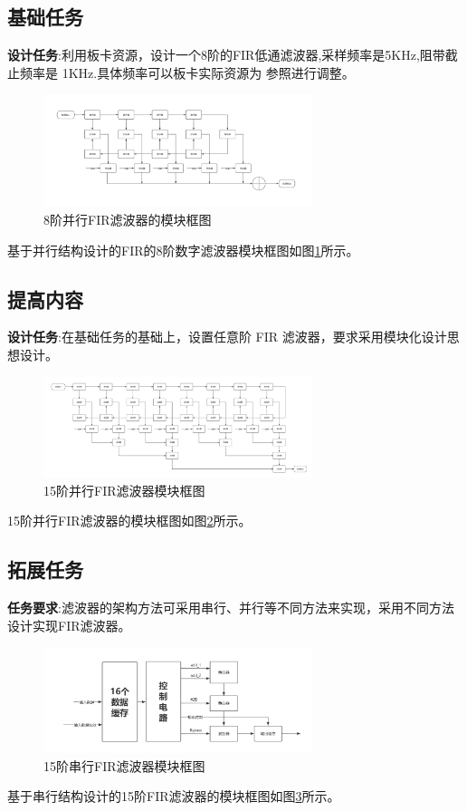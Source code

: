 \documentclass{article}
\begin{document}
\subsection*{基础任务}
\textbf{设计任务}:利用板卡资源，设计一个8阶的FIR低通滤波器,采样频率是5KHz,阻带截止频率是 1KHz.具体频率可以板卡实际资源为
参照进行调整。
\begin{figure}[htbp]
    \centering
    \includegraphics[width=0.7\textwidth]{image/2024-06-28-11-13-34.png}
    \caption{8阶并行FIR滤波器的模块框图}
    \label{image_principle_base_1}
\end{figure}
基于并行结构设计的FIR的8阶数字滤波器模块框图如图\ref{image_principle_base_1}所示。
\subsection*{提高内容}
\textbf{设计任务}:在基础任务的基础上，设置任意阶 FIR 滤波器，要求采用模块化设计思想设计。
\begin{figure}[htbp]
    \centering
    \includegraphics[width=0.7\textwidth]{image/2024-06-28-11-13-08.png}
    \caption{15阶并行FIR滤波器模块框图}
    \label{image_principle_improve_1}
\end{figure}
15阶并行FIR滤波器的模块框图如图\ref{image_principle_improve_1}所示。
\subsection*{拓展任务}
\textbf{任务要求}:滤波器的架构方法可采用串行、并行等不同方法来实现，采用不同方法设计实现FIR滤波器。
\begin{figure}[htbp]
    \centering
    \includegraphics[width=0.7\textwidth]{image/2024-06-28-11-11-33.png}
    \caption{15阶串行FIR滤波器模块框图}
    \label{image_principle_extend_1}
\end{figure}
基于串行结构设计的15阶FIR滤波器的模块框图如图\ref{image_principle_extend_1}所示。
\end{document}
